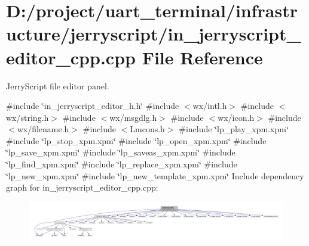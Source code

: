 \section{D\+:/project/uart\+\_\+terminal/infrastructure/jerryscript/in\+\_\+jerryscript\+\_\+editor\+\_\+cpp.cpp File Reference}
\label{in__jerryscript__editor__cpp_8cpp}


Jerry\+Script file editor panel.  


{\ttfamily \#include \char`\"{}in\+\_\+jerryscript\+\_\+editor\+\_\+h.\+h\char`\"{}}\newline
{\ttfamily \#include $<$wx/intl.\+h$>$}\newline
{\ttfamily \#include $<$wx/string.\+h$>$}\newline
{\ttfamily \#include $<$wx/msgdlg.\+h$>$}\newline
{\ttfamily \#include $<$wx/icon.\+h$>$}\newline
{\ttfamily \#include $<$wx/filename.\+h$>$}\newline
{\ttfamily \#include $<$Lmcons.\+h$>$}\newline
{\ttfamily \#include \char`\"{}lp\+\_\+play\+\_\+xpm.\+xpm\char`\"{}}\newline
{\ttfamily \#include \char`\"{}lp\+\_\+stop\+\_\+xpm.\+xpm\char`\"{}}\newline
{\ttfamily \#include \char`\"{}lp\+\_\+open\+\_\+xpm.\+xpm\char`\"{}}\newline
{\ttfamily \#include \char`\"{}lp\+\_\+save\+\_\+xpm.\+xpm\char`\"{}}\newline
{\ttfamily \#include \char`\"{}lp\+\_\+saveas\+\_\+xpm.\+xpm\char`\"{}}\newline
{\ttfamily \#include \char`\"{}lp\+\_\+find\+\_\+xpm.\+xpm\char`\"{}}\newline
{\ttfamily \#include \char`\"{}lp\+\_\+replace\+\_\+xpm.\+xpm\char`\"{}}\newline
{\ttfamily \#include \char`\"{}lp\+\_\+new\+\_\+xpm.\+xpm\char`\"{}}\newline
{\ttfamily \#include \char`\"{}lp\+\_\+new\+\_\+template\+\_\+xpm.\+xpm\char`\"{}}\newline
Include dependency graph for in\+\_\+jerryscript\+\_\+editor\+\_\+cpp.\+cpp\+:
\nopagebreak
\begin{figure}[H]
\begin{center}
\leavevmode
\includegraphics[width=350pt]{in__jerryscript__editor__cpp_8cpp__incl}
\end{center}
\end{figure}


